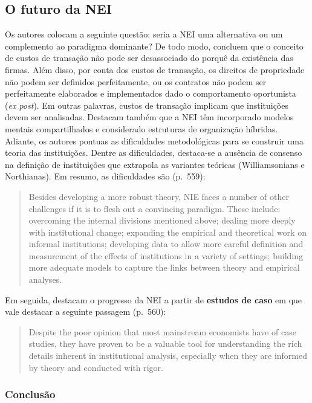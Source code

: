 \subsection*{O futuro da NEI}

Os autores colocam a seguinte questão: seria a NEI uma alternativa ou um complemento ao paradigma dominante? De todo modo, concluem que o conceito de custos de transação não pode ser desassociado do porquê da existência das firmas. Além disso, por conta dos custos de transação, os direitos de propriedade não podem ser definidos perfeitamente, ou os contratos não podem ser perfeitamente elaborados e implementados dado o comportamento oportunista (\textit{ex post}). Em outras palavras, custos de transação implicam que instituições devem ser analisadas. 
Destacam também que a NEI têm incorporado modelos mentais compartilhados e considerado estruturas de organização híbridas.
Adiante, os autores pontuas as dificuldades metodológicas para se construir uma teoria das instituições.
Dentre as dificuldades, destaca-se a ausência de consenso na definição de instituições que extrapola as variantes teóricas (Williamsonians e Northianas). Em resumo, as dificuldades são (p.~559):

\begin{quotation}
	Besides developing a more robust theory, NIE faces a number of other
	challenges if it is to flesh out a convincing paradigm. These include: overcoming
	the internal divisions mentioned above; dealing more deeply with institutional
	change; expanding the empirical and theoretical work on informal institutions;
	developing data to allow more careful definition and measurement of the
	effects of institutions in a variety of settings; building more adequate models
	to capture the links between theory and empirical analyses.
\end{quotation}

Em seguida, destacam o progresso da NEI a partir de \textbf{estudos de caso} em que vale destacar a seguinte passagem (p.~560):

\begin{quotation}
	Despite the poor opinion that most mainstream economists have of case studies,
	they have proven to be a valuable tool for understanding the rich details
	inherent in institutional analysis, especially when they are informed by theory
	and conducted with rigor.
	
\end{quotation}

\subsubsection*{Conclusão}

